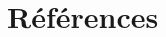\documentclass[11pt, french]{article}
\begin{document}
\renewcommand{\tablename}{Tableau}
\renewcommand{\listfigurename}{Liste des figures}

\begin{spacing}{1}
    \listoftodos
\end{spacing}




\begin{spacing}{1}
    \tableofcontents
\end{spacing}

\newpage

\begin{spacing}{1}
    \listoffigures
\end{spacing}

\newpage

\begin{spacing}{1}
    \listoftables
\end{spacing}

\newpage







\newpage

\section{Références}
\printbibliography[heading=none]

\newpage

\begin{appendices}
    
\end{appendices}

\newpage


\end{document}
